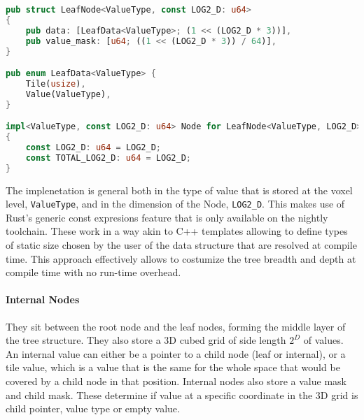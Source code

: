 \begin{lstlisting}[language=rust, captionpos=b, caption={
    \texttt{LeafNode} definition.
    In the original paper\supercite{vdb2013} node data is set as a union instead of a enum, in order to save on memory space, only using the masks to determine the type of a particular values.
    In this implementation a enum is used strictly for \emph{ergonomics}, as the extra 1 byte of memory per value is generally not expensive on heap allocated memory.
    The value mask will still be curcial for the GPU version of VDB where there is more need for effective memory management and shading languages do not have enum support.
    In the \texttt{Node} trait implementation, since these nodes are the bottom level in the hierarchy (meaning they have no children), their in-memory dimensions are the same as their world space dimensions.
  }, label={code:leaf}]
pub struct LeafNode<ValueType, const LOG2_D: u64>
{
    pub data: [LeafData<ValueType>; (1 << (LOG2_D * 3))],
    pub value_mask: [u64; ((1 << (LOG2_D * 3)) / 64)],
}

pub enum LeafData<ValueType> {
    Tile(usize),
    Value(ValueType),
}

impl<ValueType, const LOG2_D: u64> Node for LeafNode<ValueType, LOG2_D>
{
    const LOG2_D: u64 = LOG2_D;
    const TOTAL_LOG2_D: u64 = LOG2_D;
}
\end{lstlisting}

The implenetation is general both in the type of value that is stored at the voxel level, \verb|ValueType|, and in the dimension of the Node, \verb|LOG2_D|. This makes use of Rust's generic const expresions feature \supercite{rust:generic} that is only available on the nightly toolchain. These work in a way akin to C++ templates allowing to define types of static size chosen by the user of the data structure that are resolved at compile time. This approach effectively allows to costumize the tree breadth and depth at compile time with no run-time overhead.

\paragraph{Internal Nodes} They sit between the root node and the leaf nodes, forming the middle layer of the tree structure.
They also store a 3D cubed grid of side length $2^{D}$ of values. An internal value can either be a pointer to a child node (leaf or internal), or a tile value, which is a value that is the same for the whole space that would be covered by a child node in that position.
Internal nodes also store a value mask and child mask. These determine if value at a specific coordinate in the 3D grid is child pointer, value type or empty value.


